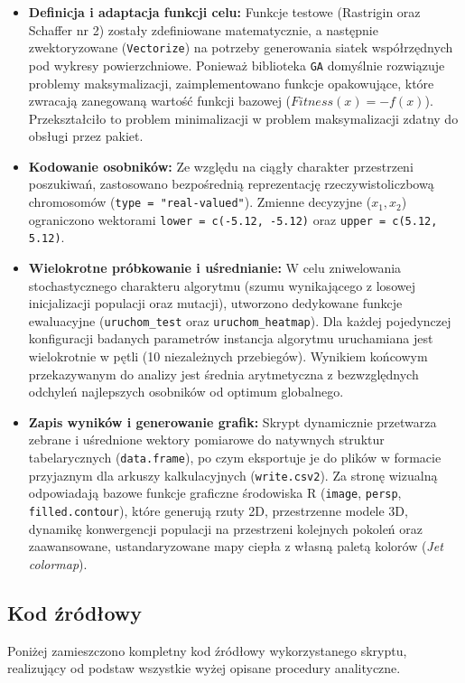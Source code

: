 \documentclass[a4paper,12pt]{article}
\begin{document}
\begin{itemize}
    \item \textbf{Definicja i adaptacja funkcji celu:} Funkcje testowe (Rastrigin oraz Schaffer nr 2) zostały zdefiniowane matematycznie, a następnie zwektoryzowane (\texttt{Vectorize}) na potrzeby generowania siatek współrzędnych pod wykresy powierzchniowe. Ponieważ biblioteka \texttt{GA} domyślnie rozwiązuje problemy maksymalizacji, zaimplementowano funkcje opakowujące, które zwracają zanegowaną wartość funkcji bazowej ($Fitness(x) = -f(x)$). Przekształciło to problem minimalizacji w problem maksymalizacji zdatny do obsługi przez pakiet.
    \item \textbf{Kodowanie osobników:} Ze względu na ciągły charakter przestrzeni poszukiwań, zastosowano bezpośrednią reprezentację rzeczywistoliczbową chromosomów (\texttt{type = "real-valued"}). Zmienne decyzyjne ($x_1, x_2$) ograniczono wektorami \texttt{lower = c(-5.12, -5.12)} oraz \texttt{upper = c(5.12, 5.12)}.
    \item \textbf{Wielokrotne próbkowanie i uśrednianie:} W celu zniwelowania stochastycznego charakteru algorytmu (szumu wynikającego z losowej inicjalizacji populacji oraz mutacji), utworzono dedykowane funkcje ewaluacyjne (\texttt{uruchom\_test} oraz \texttt{uruchom\_heatmap}). Dla każdej pojedynczej konfiguracji badanych parametrów instancja algorytmu uruchamiana jest wielokrotnie w pętli (10 niezależnych przebiegów). Wynikiem końcowym przekazywanym do analizy jest średnia arytmetyczna z bezwzględnych odchyleń najlepszych osobników od optimum globalnego.
    \item \textbf{Zapis wyników i generowanie grafik:} Skrypt dynamicznie przetwarza zebrane i uśrednione wektory pomiarowe do natywnych struktur tabelarycznych (\texttt{data.frame}), po czym eksportuje je do plików w formacie przyjaznym dla arkuszy kalkulacyjnych (\texttt{write.csv2}). Za stronę wizualną odpowiadają bazowe funkcje graficzne środowiska R (\texttt{image}, \texttt{persp}, \texttt{filled.contour}), które generują rzuty 2D, przestrzenne modele 3D, dynamikę konwergencji populacji na przestrzeni kolejnych pokoleń oraz zaawansowane, ustandaryzowane mapy ciepła z własną paletą kolorów (\textit{Jet colormap}).
\end{itemize}

\subsection{Kod źródłowy}
Poniżej zamieszczono kompletny kod źródłowy wykorzystanego skryptu, realizujący od podstaw wszystkie wyżej opisane procedury analityczne.
\end{document}
